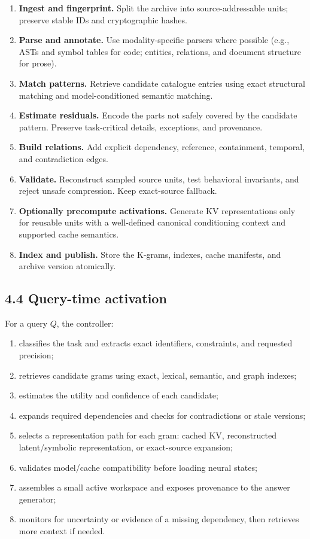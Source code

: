 \documentclass[
  10pt,
]{article}
\providecommand{\tightlist}{%
  \setlength{\itemsep}{0pt}\setlength{\parskip}{0pt}}
\begin{document}
\begin{enumerate}
\def\labelenumi{\arabic{enumi}.}
\tightlist
\item
  \textbf{Ingest and fingerprint.} Split the archive into
  source-addressable units; preserve stable IDs and cryptographic
  hashes.
\item
  \textbf{Parse and annotate.} Use modality-specific parsers where
  possible (e.g., ASTs and symbol tables for code; entities, relations,
  and document structure for prose).
\item
  \textbf{Match patterns.} Retrieve candidate catalogue entries using
  exact structural matching and model-conditioned semantic matching.
\item
  \textbf{Estimate residuals.} Encode the parts not safely covered by
  the candidate pattern. Preserve task-critical details, exceptions, and
  provenance.
\item
  \textbf{Build relations.} Add explicit dependency, reference,
  containment, temporal, and contradiction edges.
\item
  \textbf{Validate.} Reconstruct sampled source units, test behavioral
  invariants, and reject unsafe compression. Keep exact-source fallback.
\item
  \textbf{Optionally precompute activations.} Generate KV
  representations only for reusable units with a well-defined canonical
  conditioning context and supported cache semantics.
\item
  \textbf{Index and publish.} Store the K-grams, indexes, cache
  manifests, and archive version atomically.
\end{enumerate}

\subsection{4.4 Query-time activation}\label{query-time-activation}

For a query \(Q\), the controller:

\begin{enumerate}
\def\labelenumi{\arabic{enumi}.}
\tightlist
\item
  classifies the task and extracts exact identifiers, constraints, and
  requested precision;
\item
  retrieves candidate grams using exact, lexical, semantic, and graph
  indexes;
\item
  estimates the utility and confidence of each candidate;
\item
  expands required dependencies and checks for contradictions or stale
  versions;
\item
  selects a representation path for each gram: cached KV, reconstructed
  latent/symbolic representation, or exact-source expansion;
\item
  validates model/cache compatibility before loading neural states;
\item
  assembles a small active workspace and exposes provenance to the
  answer generator;
\item
  monitors for uncertainty or evidence of a missing dependency, then
  retrieves more context if needed.
\end{enumerate}
\end{document}
